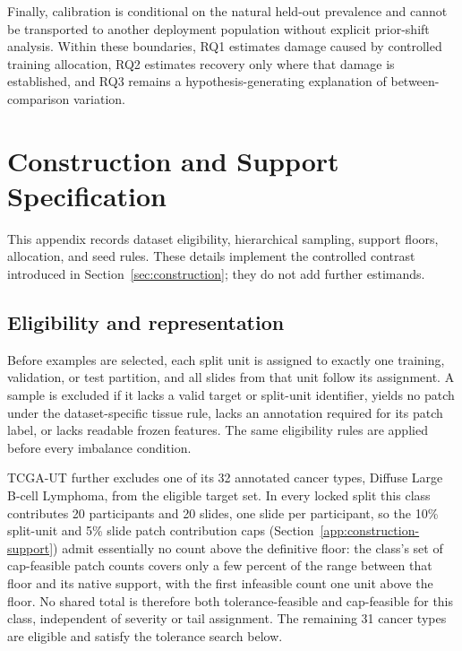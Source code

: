 \documentclass[11pt]{article}
\begin{document}
Finally, calibration is conditional on the natural held-out prevalence and cannot be transported to another deployment population without explicit prior-shift analysis. Within these boundaries, RQ1 estimates damage caused by controlled training allocation, RQ2 estimates recovery only where that damage is established, and RQ3 remains a hypothesis-generating explanation of between-comparison variation.

\clearpage
\appendix
{}
{}
\section{Construction and Support Specification}
\label{app:construction}
This appendix records dataset eligibility, hierarchical sampling, support floors, allocation, and seed rules. These details implement the controlled contrast introduced in Section~\ref{sec:construction}; they do not add further estimands.

\subsection{Eligibility and representation}
Before examples are selected, each split unit is assigned to exactly one training, validation, or test partition, and all slides from that unit follow its assignment. A sample is excluded if it lacks a valid target or split-unit identifier, yields no patch under the dataset-specific tissue rule, lacks an annotation required for its patch label, or lacks readable frozen features. The same eligibility rules are applied before every imbalance condition.

TCGA-UT further excludes one of its 32 annotated cancer types, Diffuse Large B-cell Lymphoma, from the eligible target set. In every locked split this class contributes 20 participants and 20 slides, one slide per participant, so the 10\% split-unit and 5\% slide patch contribution caps (Section~\ref{app:construction-support}) admit essentially no count above the definitive floor: the class's set of cap-feasible patch counts covers only a few percent of the range between that floor and its native support, with the first infeasible count one unit above the floor. No shared total is therefore both tolerance-feasible and cap-feasible for this class, independent of severity or tail assignment. The remaining 31 cancer types are eligible and satisfy the tolerance search below.
\end{document}
